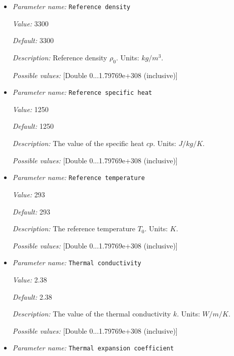 \begin{itemize}
{\it Possible values:} [List list of <[Double 0...1.79769e+308 (inclusive)]> of length 0...4294967295 (inclusive)]
\item {\it Parameter name:} {\tt Reference density}
\label{parameters:Material model/Latent heat/Reference density}


{\it Value:} 3300


{\it Default:} 3300


{\it Description:} Reference density $\rho_0$. Units: $kg/m^3$.


{\it Possible values:} [Double 0...1.79769e+308 (inclusive)]
\item {\it Parameter name:} {\tt Reference specific heat}
\label{parameters:Material model/Latent heat/Reference specific heat}


{\it Value:} 1250


{\it Default:} 1250


{\it Description:} The value of the specific heat $cp$. Units: $J/kg/K$.


{\it Possible values:} [Double 0...1.79769e+308 (inclusive)]
\item {\it Parameter name:} {\tt Reference temperature}
\label{parameters:Material model/Latent heat/Reference temperature}


{\it Value:} 293


{\it Default:} 293


{\it Description:} The reference temperature $T_0$. Units: $K$.


{\it Possible values:} [Double 0...1.79769e+308 (inclusive)]
\item {\it Parameter name:} {\tt Thermal conductivity}
\label{parameters:Material model/Latent heat/Thermal conductivity}


{\it Value:} 2.38


{\it Default:} 2.38


{\it Description:} The value of the thermal conductivity $k$. Units: $W/m/K$.


{\it Possible values:} [Double 0...1.79769e+308 (inclusive)]
\item {\it Parameter name:} {\tt Thermal expansion coefficient}
\label{parameters:Material model/Latent heat/Thermal expansion coefficient}



\end{itemize}
